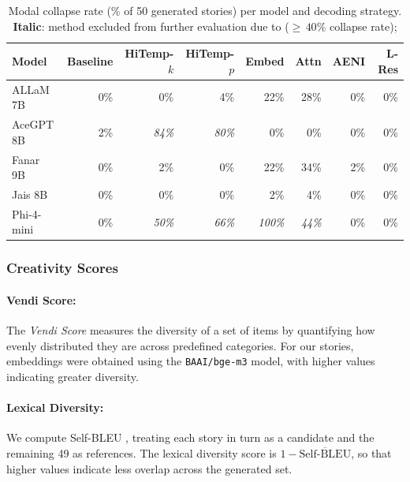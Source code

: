 \documentclass[11pt]{article}
\begin{document}
\begin{table}[b]
\centering
\small
\setlength{\tabcolsep}{6pt}
\renewcommand{\arraystretch}{1.2}
\caption{%
  Modal collapse rate (\% of 50 generated stories) per model and decoding
  strategy.  \textbf{Italic}: method excluded from further evaluation due to (${\geq}\,40\%$ collapse rate);}
\label{tab:tmc}
\begin{tabular}{l *{7}{r}}
\toprule
\textbf{Model}
  & \textbf{Baseline}
  & \textbf{HiTemp-$k$}
  & \textbf{HiTemp-$p$}
  & \textbf{Embed}
  & \textbf{Attn}
  & \textbf{AENI}
  & \textbf{L-Res} \\
\midrule
ALLaM 7B
  & {0\%}
  & {0\%}
  & 4\%
  & {22}\%
  & {28}\%
  & {0\%}
  & {0\%} \\
 
AceGPT 8B
  & 2\%
  & \textit{84\%}
  & \textit{80\%}
  & {0\%}
  & {0\%}
  & {0\%}
  & 0\% \\
 
Fanar 9B
  & {0\%}
  & 2\%
  & {0\%}
  & {22}\%
  & {34}\%
  & 2\%
  & {0\%} \\
 
Jais 8B
  & {0\%}
  & {0\%}
  & {0\%}
  & 2\%
  & 4\%
  & {0\%}
  & {0\%} \\
 
Phi-4-mini
  & {0\%}
  & \textit{50\%}
  & \textit{66\%}
  & \textit{100\%}
  & \textit{44\%}
  & {0\%}
  & {0\%} \\
\bottomrule
\end{tabular}
\end{table}

\subsubsection{Creativity Scores}
\label{sec:creativescore}
\paragraph{Vendi Score:} The \textit{Vendi Score} \cite{friedman2023vendiscorediversityevaluation} measures the diversity of a set of items by quantifying how evenly distributed they are across predefined categories. For our stories, embeddings were obtained using the \texttt{BAAI/bge-m3} model, with higher values indicating greater diversity.

\paragraph{Lexical Diversity:} We compute Self-BLEU \cite{zhu2018texygen}, treating each story in turn as a candidate and the remaining 49 as references. The lexical diversity score is $1 - \overline{\mathrm{Self\text{-}BLEU}}$, so that higher values indicate less overlap across the generated set.
\end{document}
